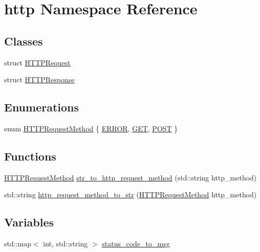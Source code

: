 \hypertarget{namespacehttp}{}\section{http Namespace Reference}
\label{namespacehttp}
\subsection*{Classes}
\begin{DoxyCompactItemize}
\item 
struct \hyperlink{structhttp_1_1HTTPRequest}{H\+T\+T\+P\+Request}
\item 
struct \hyperlink{structhttp_1_1HTTPResponse}{H\+T\+T\+P\+Response}
\end{DoxyCompactItemize}
\subsection*{Enumerations}
\begin{DoxyCompactItemize}
\item 
enum \hyperlink{namespacehttp_a46f9089c75601ed6b7e6a542cdd9976f}{H\+T\+T\+P\+Request\+Method} \{ \hyperlink{namespacehttp_a46f9089c75601ed6b7e6a542cdd9976fa35031fab2b9c91fef7f51b151d845612}{E\+R\+R\+OR}, 
\hyperlink{namespacehttp_a46f9089c75601ed6b7e6a542cdd9976faad87349b6ec813144e72c316f0ed45e0}{G\+ET}, 
\hyperlink{namespacehttp_a46f9089c75601ed6b7e6a542cdd9976fa451d3d8d46675b86802c405f179e92ab}{P\+O\+ST}
 \}
\end{DoxyCompactItemize}
\subsection*{Functions}
\begin{DoxyCompactItemize}
\item 
\hyperlink{namespacehttp_a46f9089c75601ed6b7e6a542cdd9976f}{H\+T\+T\+P\+Request\+Method} \hyperlink{namespacehttp_a5ba1900a0d4aac4aef53ca5a7bcdd025}{str\+\_\+to\+\_\+http\+\_\+request\+\_\+method} (std\+::string http\+\_\+method)
\item 
std\+::string \hyperlink{namespacehttp_a17b47b6de921aecb55eb122231c314a3}{http\+\_\+request\+\_\+method\+\_\+to\+\_\+str} (\hyperlink{namespacehttp_a46f9089c75601ed6b7e6a542cdd9976f}{H\+T\+T\+P\+Request\+Method} http\+\_\+method)
\end{DoxyCompactItemize}
\subsection*{Variables}
\begin{DoxyCompactItemize}
\item 
std\+::map$<$ int, std\+::string $>$ \hyperlink{namespacehttp_a732419ee002952aab275c7f35b7387ff}{status\+\_\+code\+\_\+to\+\_\+msg}
\end{DoxyCompactItemize}



